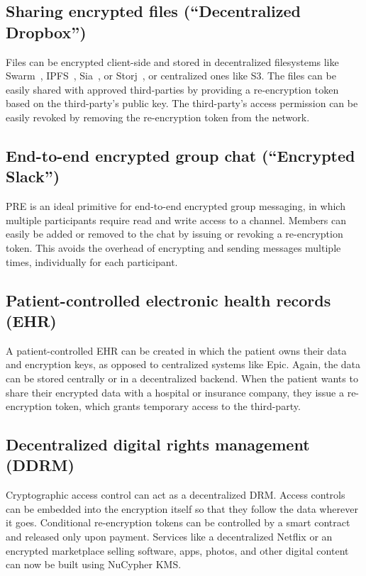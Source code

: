 \documentclass[longbibliography,nofootinbib]{revtex4-1}
\newcommand{\kms}{NuCypher KMS}
\begin{document}
\subsection{Sharing encrypted files (``Decentralized Dropbox'')}
\label{sec:files}
Files can be encrypted client-side and stored in decentralized filesystems like Swarm~\cite{swarm}, IPFS~\cite{whitepaper:ipfs}, Sia~\cite{web:sia}, or Storj~\cite{web:storj}, or centralized ones like S3.
The files can be easily shared with approved third-parties by providing a re-encryption token based on the third-party's
public key.
The third-party's access permission can be easily revoked by removing the re-encryption token from the network.

\subsection{End-to-end encrypted group chat (``Encrypted Slack'')}
PRE is an ideal primitive for end-to-end encrypted group messaging, in which multiple participants require read and write
access to a channel. Members can easily be added or removed to the chat by issuing or revoking a re-encryption token.
This avoids the overhead of encrypting and sending messages multiple times, individually for each participant.

\subsection{Patient-controlled electronic health records (EHR)}
A patient-controlled EHR can be created in which the patient owns their data and encryption keys, as opposed to centralized
systems like Epic.
Again, the data can be stored centrally or in a decentralized backend.
When the patient wants to share their encrypted data with a hospital or insurance company, they issue a re-encryption token,
which grants temporary access to the third-party.

\subsection{Decentralized digital rights management (DDRM)}
\label{sec:drm}
Cryptographic access control can act as a decentralized DRM.
Access controls can be embedded into the encryption itself so that they follow the data wherever it goes.
Conditional re-encryption tokens can be controlled by a smart contract and released only upon payment.
Services like a decentralized Netflix or an encrypted marketplace selling software, apps, photos, and other digital content
can now be built using \kms.
\end{document}
